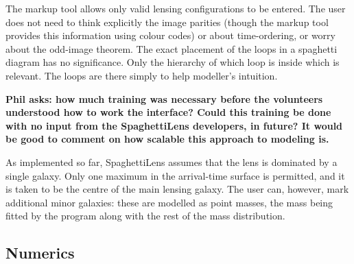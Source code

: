 \documentclass[usenatbib]{mn2e}
\newcommand{\spl}{SpaghettiLens\xspace}
\begin{document}
The markup tool allows only valid lensing configurations to be
entered.  The user does not need to think explicitly the image
parities (though the markup tool provides this information using
colour codes) or about time-ordering, or worry about the odd-image
theorem.  The exact placement of the loops in a spaghetti diagram has
no significance.  Only the hierarchy of which loop is inside which is
relevant.  The loops are there simply to help modeller's intuition.

{\bf Phil asks: how much training was necessary before the volunteers
understood how to work the interface? Could this training be done with
no input from the \spl developers, in future? It would be good to
comment on how scalable this approach to modeling is.}

As implemented so far, \spl assumes that the lens is dominated by a
single galaxy.  Only one maximum in the arrival-time surface
is permitted, and it is taken to be the centre of the main lensing
galaxy.  The user can, however, mark additional minor galaxies: these
are modelled as point masses, the mass being fitted by the program along
with the rest of the mass distribution.


\subsection{Numerics}
\end{document}
